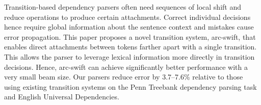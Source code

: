 Transition-based dependency parsers often need sequences of local shift and reduce operations to produce certain attachments. Correct individual decisions hence require global information about the sentence context and mistakes cause error propagation. This paper proposes a novel transition system, arc-swift, that enables direct attachments between tokens farther apart with a single transition. This allows the parser to leverage lexical information more directly in transition decisions. Hence, arc-swift can achieve significantly better performance with a very small beam size. Our parsers reduce error by 3.7--7.6\% relative to those using existing transition systems on the Penn Treebank dependency parsing task and English Universal Dependencies.
